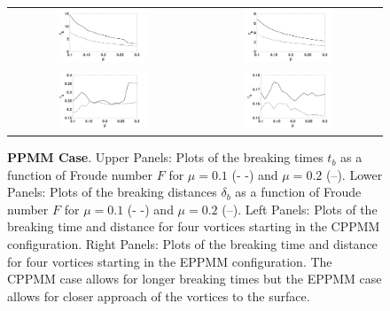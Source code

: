 \documentclass[a4paper,11pt]{article}
\begin{document}
\begin{figure}[!h]
\centering
\begin{tabular}{cc}
\includegraphics[width=0.5\textwidth]{froude_comp_ppmm} & \includegraphics[width=0.5\textwidth]{froude_comp_ppmm_sym}\\
\includegraphics[width=0.5\textwidth]{zmb_ppmm} & \includegraphics[width=0.5\textwidth]{zmb_ppmm_sym}
\end{tabular}
\caption{\small {\bf PPMM Case}. Upper Panels: Plots of the breaking times $t_{b}$ as a function of Froude number $F$ for $\mu=0.1$ (- -) and $\mu=0.2$ (--).  Lower Panels: Plots of the breaking distances $\delta_{b}$ as a function of Froude number $F$ for $\mu=0.1$ (- -) and $\mu=0.2$ (--). Left Panels: Plots of the breaking time and distance for four vortices starting in the CPPMM configuration.  Right Panels: Plots of the breaking time and distance for four vortices starting in the EPPMM configuration.  The CPPMM case allows for longer breaking times but the EPPMM case allows for closer approach of the vortices to the surface.}
\label{fig:froudecomp_ppmm}
\end{figure}
\end{document}
